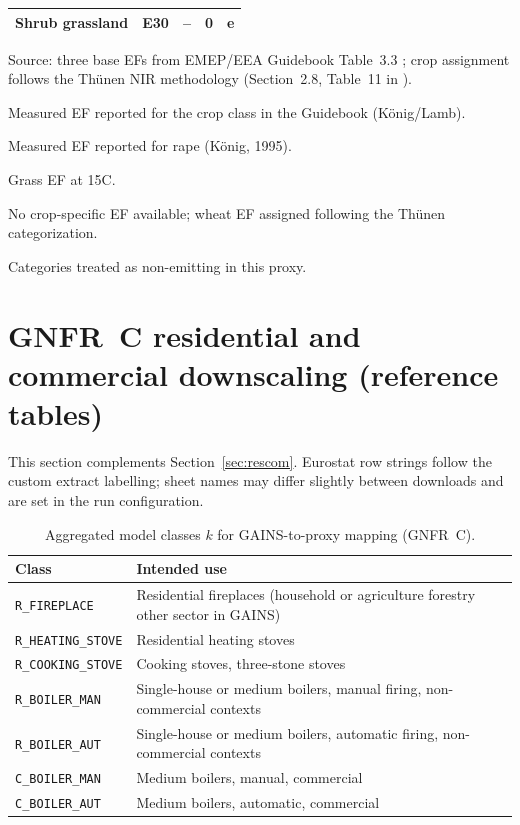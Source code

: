 \begin{table}[htbp]
\begin{threeparttable}
\begin{tabular}{@{}p{4.8cm}p{2.4cm}ccp{3.2cm}@{}}
    Shrub grassland          & E30       & --    & 0    & e \\
    \bottomrule
  \end{tabular}
  \begin{tablenotes}[flushleft]
    \footnotesize
    \item Source: three base EFs from EMEP/EEA Guidebook Table~3.3 \citep{EEA_guidebook}; crop assignment follows the Th{\"u}nen NIR methodology (Section~2.8, Table~11 in \citet{thuenen_nmvoc}).
    \item[a] Measured EF reported for the crop class in the Guidebook (K\"onig/Lamb).
    \item[b] Measured EF reported for rape (K\"onig, 1995).
    \item[c] Grass EF at 15\textdegree C.
    \item[d] No crop-specific EF available; wheat EF assigned following the Th{\"u}nen categorization.
    \item[e] Categories treated as non-emitting in this proxy.
  \end{tablenotes}
  \end{threeparttable}
\end{table}


\section{GNFR~C residential and commercial downscaling (reference tables)}
\label{app:rescom_downscaling}

This section complements Section~\ref{sec:rescom}. Eurostat row strings follow
the custom extract labelling; sheet names may differ slightly between downloads
and are set in the run configuration.

\begin{table}[htbp]
  \centering
  \caption{Aggregated model classes $k$ for GAINS-to-proxy mapping (GNFR~C).}
  \label{tab:rescom_model_classes}
  \begin{tabular}{p{3.5cm}p{9.5cm}}
    \hline
    Class & Intended use \\
    \hline
    \texttt{R\_FIREPLACE} & Residential fireplaces (household or agriculture
      forestry other sector in GAINS) \\
    \texttt{R\_HEATING\_STOVE} & Residential heating stoves \\
    \texttt{R\_COOKING\_STOVE} & Cooking stoves, three-stone stoves \\
    \texttt{R\_BOILER\_MAN} & Single-house or medium boilers, manual firing,
      non-commercial contexts \\
    \texttt{R\_BOILER\_AUT} & Single-house or medium boilers, automatic firing,
      non-commercial contexts \\
    \texttt{C\_BOILER\_MAN} & Medium boilers, manual, commercial \\
    \texttt{C\_BOILER\_AUT} & Medium boilers, automatic, commercial \\
    \hline
  \end{tabular}
\end{table}

